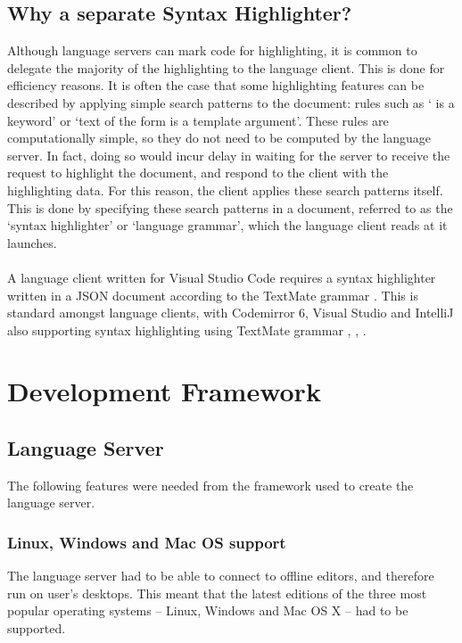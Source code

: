 \documentclass[../main.tex]{subfiles}
\begin{document}
\subsection{Why a separate Syntax Highlighter?}
Although language servers can mark code for highlighting, it is common to delegate the majority of the highlighting to the language client. This is done for efficiency reasons. It is often the case that some highlighting features can be described by applying simple search patterns to the document: rules such as ` is a keyword' or `text of the form  is a template argument'. These rules are computationally simple, so they do not need to be computed by the language server. In fact, doing so would incur delay in waiting for the server to receive the request to highlight the document, and respond to the client with the highlighting data. For this reason, the client applies these search patterns itself. This is done by specifying these search patterns in a document, referred to as the `syntax highlighter' or `language grammar', which the language client reads at it launches.
\\
\\
A language client written for Visual Studio Code requires a syntax highlighter written in a JSON document according to the TextMate grammar \cite{textmate_grammars_spec}. This is standard amongst language clients, with Codemirror 6, Visual Studio and IntelliJ also supporting syntax highlighting using TextMate grammar \cite{codemirror_textmate}, \cite{visual_studio_textmate}, \cite{intellij_textmate}.
%
%
%
\section{Development Framework}
\subsection{Language Server}
The following features were needed from the framework used to create the language server.

\subsubsection{Linux, Windows and Mac OS support}
The language server had to be able to connect to offline editors, and therefore run on user's desktops. This meant that the latest editions of the three most popular operating systems -- Linux, Windows and Mac OS X -- had to be supported.
\end{document}
